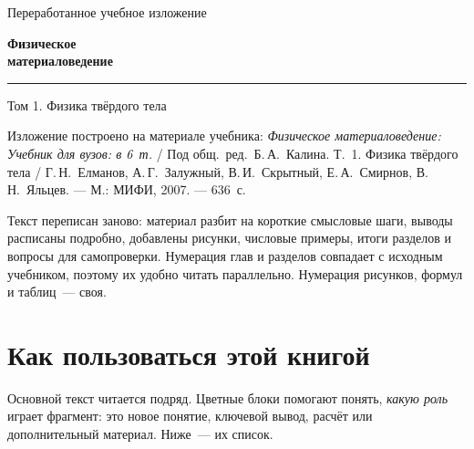 \begin{titlepage}
\centering
\vspace*{18mm}
{\sffamily\large\color{fmGray} Переработанное учебное изложение\par}
\vspace{14mm}
{\sffamily\bfseries\fontsize{30}{36}\selectfont\color{fmHead}
  Физическое\\[2mm] материаловедение\par}
\vspace{6mm}
{\color{fmBlue}\rule{0.55\textwidth}{1.2pt}\par}
\vspace{6mm}
{\sffamily\LARGE\color{fmHead} Том 1. Физика твёрдого тела\par}
\vspace{10mm}
{\sffamily\Large \fmSubtitle\par}
\vfill
\begin{minipage}{0.86\textwidth}\small\raggedright
Изложение построено на материале учебника:
\emph{Физическое материаловедение: Учебник для вузов: в 6~т.} / Под общ.\ ред.\ Б.\,А.~Калина.
Т.~1. Физика твёрдого тела / Г.\,Н.~Елманов, А.\,Г.~Залужный, В.\,И.~Скрытный,
Е.\,А.~Смирнов, В.\,Н.~Яльцев. — М.: МИФИ, 2007. — 636~с.

\medskip
Текст переписан заново: материал разбит на короткие смысловые шаги,
выводы расписаны подробно, добавлены рисунки, числовые примеры,
итоги разделов и вопросы для самопроверки. Нумерация глав и разделов
совпадает с исходным учебником, поэтому их удобно читать параллельно.
Нумерация рисунков, формул и таблиц~— своя.
\end{minipage}
\vspace{12mm}
\end{titlepage}

\cleardoublepage
\chapter*{Как пользоваться этой книгой}

Основной текст читается подряд. Цветные блоки помогают понять, \emph{какую роль}
играет фрагмент: это новое понятие, ключевой вывод, расчёт или
дополнительный материал. Ниже~— их список.

